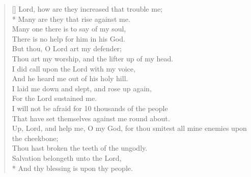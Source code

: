 \documentclass[MAIN]{subfiles}
\begin{document}
\settowidth{\versewidth}{Lord, how they are increased that trouble me;}
\begin{verse}[\versewidth]
Lord, how are they increased that trouble me;\\*
\vin Many are they that rise against me.\\
Many one there is to say of my soul,\\
\vin There is no help for him in his God.\\
But thou, O Lord art my defender;\\
\vin Thou art my worship, and the lifter up of my head.\\
I did call upon the Lord with my voice,\\
\vin And he heard me out of his holy hill.\\
I laid me down and slept, and rose up again,\\
\vin For the Lord sustained me.\\
I will not be afraid for 10 thousands of the people\\
\vin That have set themselves against me round about.\\
Up, Lord, and help me, O my God, for thou smitest all mine enemies upon the cheekbone;\\
\vin Thou hast broken the teeth of the ungodly.\\
Salvation belongeth unto the Lord,\\*
\vin And thy blessing is upon thy people.
\end{verse}
\end{document}
